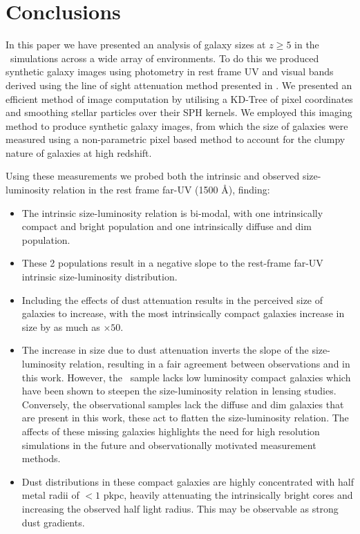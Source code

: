 \section{Conclusions}
\label{sec:conclusion}

In this paper we have presented an analysis of galaxy sizes at $z\geq5$ in the \flares\ simulations across a wide array of environments. To do this we produced synthetic galaxy images using photometry in rest frame UV and visual bands derived using the line of sight attenuation method presented in \cite{Vijayan2020}. We presented an efficient method of image computation by utilising a KD-Tree of pixel coordinates and smoothing stellar particles over their SPH kernels. We employed this imaging method to produce synthetic galaxy images, from which the size of galaxies were measured using a non-parametric pixel based method to account for the clumpy nature of galaxies at high redshift. 

Using these measurements we probed both the intrinsic and observed size-luminosity relation in the rest frame far-UV (1500 \AA), finding:

\begin{itemize}
    \item The intrinsic size-luminosity relation is bi-modal, with one intrinsically compact and bright population and one intrinsically diffuse and dim population.
    \item These 2 populations result in a negative slope to the rest-frame far-UV intrinsic size-luminosity distribution.
    \item Including the effects of dust attenuation results in the perceived size of galaxies to increase, with the most intrinsically compact galaxies increase in size by as much as $\times50$. 
    \item The increase in size due to dust attenuation inverts the slope of the size-luminosity relation, resulting in a fair agreement between observations and in this work. However, the \flares\ sample lacks low luminosity compact galaxies which have been shown to steepen the size-luminosity relation in lensing studies. Conversely, the observational samples lack the diffuse and dim galaxies that are present in this work, these act to flatten the size-luminosity relation. The affects of these missing galaxies highlights the need for high resolution simulations in the future and observationally motivated measurement methods.
    \item Dust distributions in these compact galaxies are highly concentrated with half metal radii of $<1$ pkpc, heavily attenuating the intrinsically bright cores and increasing the observed half light radius. This may be observable as strong dust gradients. 
\end{itemize}

